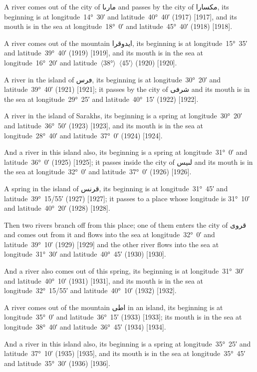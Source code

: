 \documentclass[11pt]{article}
\newcommand{\Pg}[1]{\marginpar{\footnotesize #1}}
\newcommand{\Ang}[1]{\ensuremath{#1}}
\begin{document}
A river comes out of the city of \textarabic{مارٮا} and passes by the city of \textarabic{مكسارا}, its beginning is at longitude~14°~30′ and latitude~40°~40′ (1917) [1917], and its mouth is in the sea at longitude~18°~0′ and latitude~45°~40′ (1918) [1918]\Pg{p. 127}.

A river comes out of the mountain \textarabic{ايدوقرا}, its beginning is at longitude~15°~35′ and latitude~39°~40′ (1919) [1919], and its mouth is in the sea at longitude~16°~20′ and latitude~\Ang{\langle}38°\Ang{\rangle}~\Ang{\langle}45′\Ang{\rangle} (1920) [1920].

A river in the island of \textarabic{ڡرس}, its beginning is at longitude~30°~20′ and latitude~39°~40′ (1921) [1921]; it passes by the city of \textarabic{شرفى} and its mouth is in the sea at longitude~29°~25′ and latitude~40°~15′ (1922) [1922].

A river in the island of Sarakhs, its beginning is a spring at longitude~30°~20′ and latitude~36°~50′ (1923) [1923], and its mouth is in the sea at longitude~28°~40′ and latitude~37°~0′ (1924) [1924].

And a river in this island also, its beginning is a spring at longitude~31°~0′ and latitude~36°~0′ (1925) [1925]; it passes inside the city of \textarabic{لٮيس} and its mouth is in the sea at longitude~32°~0′ and latitude~37°~0′ (1926) [1926].

A spring in the island of \textarabic{قرنس}, its beginning is at longitude~31°~45′ and latitude~39°~15/55′ (1927) [1927]; it passes to a place whose longitude is 31°~10′ and latitude~40°~20′ (1928) [1928].

Then two rivers branch off from this place; one of them enters the city of \textarabic{قروى} and comes out from it and flows into the sea at longitude~32°~0′ and latitude~39°~10′ (1929) [1929] and the other river flows into the sea at longitude~31°~30′ and latitude~40°~45′ (1930) [1930].

And a river also comes out of this spring, its beginning is at longitude~31°~30′ and latitude~40°~10′ (1931) [1931], and its mouth is in the sea at longitude~32°~15/55′ and latitude~40°~10′ (1932) [1932].

A river comes out of the mountain \textarabic{اطى} in an island, its beginning is at longitude~35°~0′ and latitude~36°~15′ (1933) [1933]; its mouth is in the sea at longitude~38°~40′ and latitude~36°~45′ (1934) [1934]\Pg{p. 128}.

And a river in this island also, its beginning is a spring at longitude~35°~25′ and latitude~37°~10′ (1935) [1935], and its mouth is in the sea at longitude~35°~45′ and latitude~35°~30′ (1936) [1936].
\end{document}

